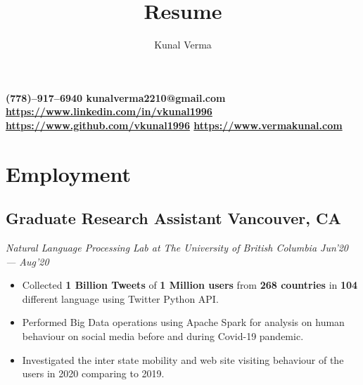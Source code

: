 \documentclass[a4paper,11pt]{article}
\makeatletter
\renewcommand{\maketitle}{
\begin{center}
{\huge\bfseries \uppercase
\theauthor}
\vspace{0em}
\end{center}
}
\makeatother
\begin{document}
\color{darkgray}
\title{Resume}
\author{Kunal Verma}
\maketitle

\begin{center}
    \bfseries {}\hspace{0.4em}(778)--917--6940\hspace{1.0em}  \hspace{0.4em}kunalverma2210@gmail.com \hspace{1.0em}
    \hspace{0.4em}\href {https://www.linkedin.com/in/vkunal1996}{https://www.linkedin.com/in/vkunal1996} \hspace{1.0em} \hspace{0.4em}\href{https://www.github.com/vkunal1996}{https://www.github.com/vkunal1996}\hspace{1.4em}  
    \hspace{0.4em}\href{https://www.vermakunal.com}{https://www.vermakunal.com}
\end{center}

\section{Employment}
\subsection{Graduate Research Assistant \hspace{24em} Vancouver, CA}
\emph{Natural Language Processing Lab at The University of British Columbia \hspace{9.4em} Jun'20 --- Aug'20}
\begin{itemize}
    \item Collected \textbf{1 Billion Tweets} of \textbf{1 Million users} from \textbf{268 countries} in \textbf{104} different language using Twitter Python API.
    \item Performed Big Data operations using Apache Spark for analysis on human behaviour on social media before and during Covid-19 pandemic. 
    \item Investigated the inter state mobility and web site visiting behaviour of the users in 2020 comparing to 2019.
\end{itemize}
\end{document}
